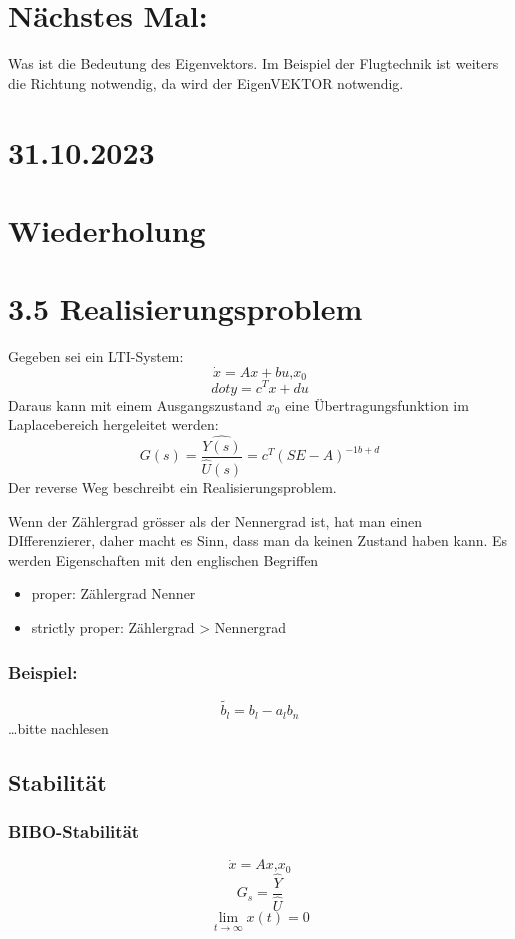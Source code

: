 \documentclass[a4paper]{article}
\begin{document}
\section*{Nächstes Mal:}
Was ist die Bedeutung des Eigenvektors. Im Beispiel der Flugtechnik ist weiters die Richtung notwendig, da wird der EigenVEKTOR notwendig.

\section*{31.10.2023}
\section*{Wiederholung}
\section*{3.5 Realisierungsproblem}
Gegeben sei ein LTI-System:
\[ \dot x = Ax+bu\text{,}x_{0} \]
\[ dot y = c^{T}x+du \]
Daraus kann mit einem Ausgangszustand $x_{0}$ eine Übertragungsfunktion im Laplacebereich hergeleitet werden:
\[ G(s)=\frac{\hat{Y(s)}}{\hat{U}(s)}=c^{T}(SE-A)^{-1b+d}\]
Der reverse Weg beschreibt ein Realisierungsproblem.

Wenn der Zählergrad grösser als der Nennergrad ist, hat man einen DIfferenzierer, daher macht es Sinn, dass man da keinen Zustand haben kann.
Es werden Eigenschaften mit den englischen Begriffen
\begin{itemize}
    \item proper: Zählergrad \ge  Nenner
    \item strictly proper: Zählergrad > Nennergrad
\end{itemize}

\subsubsection*{Beispiel:}
\[ \tilde{b_{l}}=b_{l}-a_{l}b_{n} \]
\ldots bitte nachlesen

\subsection*{Stabilität}

\subsubsection*{BIBO-Stabilität}
\[ \dot x=Ax\text{,} x_{0} \]
\[ G_{s}=\frac{\hat{Y}}{\hat{U}}\]
\[ \lim_{t \to \infty} x(t)=0 \]
\end{document}

